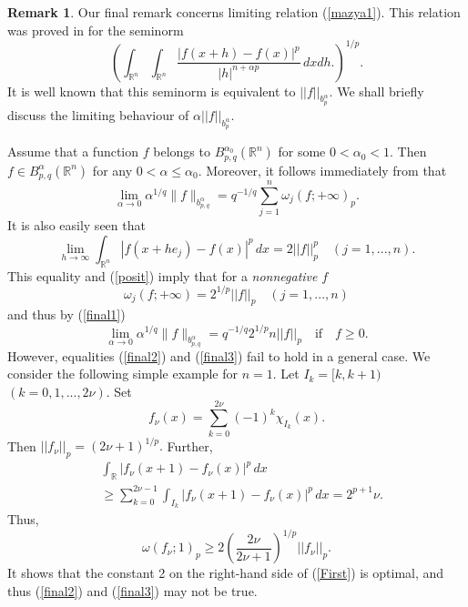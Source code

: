 \documentclass[12pt,twoside,reqno]{amsart}
\numberwithin{equation}{section}
\theoremstyle{definition}
\newtheorem{rem}[teo]{Remark}
\numberwithin{equation}{section}
\begin{document}
\begin{rem}\label{final} Our final remark concerns limiting relation (\ref{mazya1}). This relation was proved in \cite{MS}
for the seminorm
$$
\left(\int_{{\mathbb{R}}^n}\int_{{\mathbb{R}}^n} \frac{|f(x+h)-f(x)|^p}{|h|^{n+{\alpha} p}}\,dxdh.\right)^{1/p}.
$$
It is well known that this  seminorm is  equivalent to $||f||_{b_p^{\alpha}}.$
We shall briefly discuss the limiting behaviour of  ${\alpha}||f||_{b_p^{\alpha}}$.

Assume that a function $f$ belongs to $B_{p,q}^{{\alpha}_0}({\mathbb{R}}^n)$ for some $0<{\alpha}_0<1.$ Then $f\in B_{p,q}^{\alpha}({\mathbb{R}}^n)$
for any $0<{\alpha}\le {\alpha}_0.$ Moreover, it follows immediately from \cite[Lemma 1]{KMX} that
\begin{equation}\label{final1}
\lim_{{\alpha}\to  0}{\alpha}^{1/q} \|f\|_{b_{p,q}^{\alpha}}=q^{-1/q}\sum_{j=1}^n{\omega}_j(f;+\infty)_p.
\end{equation}
 It is also easily seen that
$$
\lim_{h\to \infty} \int_{{\mathbb{R}}^n} |f(x+he_j)-f(x)|^p\,dx= 2 ||f||_p^p\quad (j=1,...,n).
$$
This equality and (\ref{posit}) imply that for a {\it nonnegative} $f$
\begin{equation}\label{final2}
{\omega}_j(f;+\infty)=2^{1/p}||f||_p\quad (j=1,...,n)
\end{equation}
and thus by (\ref{final1})
\begin{equation}\label{final3}
\lim_{{\alpha}\to  0}{\alpha}^{1/q} \|f\|_{b_{p,q}^{\alpha}}=q^{-1/q}2^{1/p}n||f||_p\quad \mbox{if}\quad f\ge 0.
\end{equation}
However,  equalities (\ref{final2}) and (\ref{final3}) fail to hold in a general case. We consider the following simple example for $n=1.$ Let
$I_k=[k,k+1)$ $(k=0,1,...,2\nu).$ Set
$$
f_\nu(x)=\sum_{k=0}^{2\nu} (-1)^k\chi_{I_k}(x).
$$
Then $||f_\nu||_p=(2\nu+1)^{1/p}.$ Further,
$$
\begin{aligned}
&\int_{\mathbb{R}} |f_\nu(x+1)-f_\nu(x)|^p\,dx\\
&\ge \sum_{k=0}^{2\nu-1} \int_{I_k}|f_\nu(x+1)-f_\nu(x)|^p\,dx=2^{p+1}\nu.
\end{aligned}
$$
Thus,
$$
{\omega}(f_\nu;1)_p\ge 2\left(\frac{2\nu}{2\nu+1}\right)^{1/p}||f_\nu||_p.
$$
It shows that the constant 2 on the right-hand side of (\ref{First})
is optimal, and thus  (\ref{final2}) and (\ref{final3}) may not be true.

\end{rem}
\end{document}
